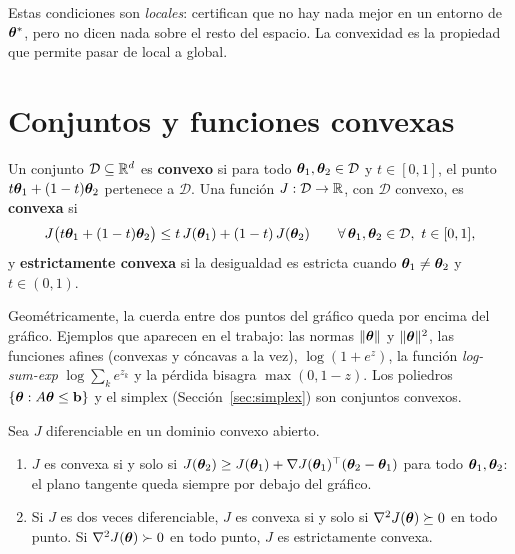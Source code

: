 Estas condiciones son \emph{locales}: certifican que no hay nada mejor en un entorno de $\boldsymbol{\theta}^*$, pero no
dicen nada sobre el resto del espacio. La convexidad es la propiedad que permite pasar de local a global.

\section{Conjuntos y funciones convexas}
\label{sec:convexidad}

\begin{definicion}
Un conjunto $\mathcal{D} \subseteq \mathbb{R}^d$ es \textbf{convexo} si para todo $\boldsymbol{\theta}_1, \boldsymbol{\theta}_2 \in \mathcal{D}$ y
$t \in [0,1]$, el punto $t\boldsymbol{\theta}_1 + (1-t)\boldsymbol{\theta}_2$ pertenece a $\mathcal{D}$. Una función $J : \mathcal{D} \to \mathbb{R}$,
con $\mathcal{D}$ convexo, es \textbf{convexa} si
\begin{equation}
  J\big(t\boldsymbol{\theta}_1 + (1-t)\boldsymbol{\theta}_2\big) \le t\,J(\boldsymbol{\theta}_1) + (1-t)\,J(\boldsymbol{\theta}_2)
  \qquad \forall\, \boldsymbol{\theta}_1, \boldsymbol{\theta}_2 \in \mathcal{D},\ t \in [0,1],
  \label{eq:def_convexa}
\end{equation}
y \textbf{estrictamente convexa} si la desigualdad es estricta cuando $\boldsymbol{\theta}_1 \ne \boldsymbol{\theta}_2$ y $t \in (0,1)$.
\end{definicion}

Geométricamente, la cuerda entre dos puntos del gráfico queda por encima del gráfico. Ejemplos que
aparecen en el trabajo: las normas $\lVert\boldsymbol{\theta}\rVert$ y $\lVert\boldsymbol{\theta}\rVert^2$, las funciones afines (convexas y
cóncavas a la vez), $\log(1 + e^z)$, la función \emph{log-sum-exp} $\log\sum_k e^{z_k}$ y la pérdida bisagra
$\max(0, 1 - z)$. Los poliedros $\{\boldsymbol{\theta} : A\boldsymbol{\theta} \le \mathbf{b}\}$ y el simplex
(Sección~\ref{sec:simplex}) son conjuntos convexos.

\begin{proposicion}
\label{prop:caracterizacion}
Sea $J$ diferenciable en un dominio convexo abierto.
\begin{enumerate}
  \item $J$ es convexa si y solo si $J(\boldsymbol{\theta}_2) \ge J(\boldsymbol{\theta}_1) + \nabla J(\boldsymbol{\theta}_1)^\top(\boldsymbol{\theta}_2 - \boldsymbol{\theta}_1)$ para todo
        $\boldsymbol{\theta}_1, \boldsymbol{\theta}_2$: el plano tangente queda siempre por debajo del gráfico.
  \item Si $J$ es dos veces diferenciable, $J$ es convexa si y solo si $\nabla^2 J(\boldsymbol{\theta}) \succeq 0$ en todo
        punto. Si $\nabla^2 J(\boldsymbol{\theta}) \succ 0$ en todo punto, $J$ es estrictamente convexa.
\end{enumerate}
\end{proposicion}


